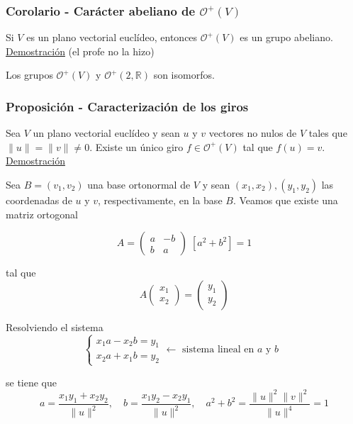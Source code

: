 \documentclass[12pt, a4paper, ones, notitlepage, openany,titlepage]{article}
\newcommand{\demostracion}{\noindent\underline{Demostración}}
\begin{document}
\subsubsection{Corolario - Carácter abeliano de $\mathcal{O}^{+}(V)$}
\noindent Si $V$ es un plano vectorial euclídeo, entonces $\mathcal{O}^{+}(V)$ es un grupo abeliano.\\

\demostracion \; (el profe no la hizo)

\noindent Los grupos $\mathcal{O}^{+}(V)$ y $\mathcal{O}^{+}(2, \mathbb{R})$ son isomorfos.

\subsubsection{Proposición - Caracterización de los giros}
Sea $V$ un plano vectorial euclídeo y sean $u$ y $v$ vectores no nulos de $V$ tales que $\|u\|=\|v\| \neq 0$. Existe un único giro $f \in \mathcal{O}^{+}(V)$ tal que $f(u)=v$.\\

\demostracion

Sea $B=\left(v_{1}, v_{2}\right)$ una base ortonormal de $V$ y sean $\left(x_{1}, x_{2}\right),\left(y_{1}, y_{2}\right)$ las coordenadas de $u$ y $v$, respectivamente, en la base $B$. Veamos que existe una matriz ortogonal

$$
A=\left(\begin{array}{rr}
	a & -b \\
	b & a
\end{array}\right)
\; [a^2 + b^2] = 1
$$

tal que
$$
A\left(\begin{array}{l}
	x_{1} \\
	x_{2}
\end{array}\right)=\left(\begin{array}{l}
	y_{1} \\
	y_{2}
\end{array}\right)
$$

Resolviendo el sistema
$$
\begin{cases}
	x_{1} a-x_{2} b=y_{1} \\ x_{2} a+x_{1} b=y_{2}
\end{cases}
\longleftarrow \text{ sistema lineal en $a$ y $b$ }
$$

se tiene que
$$
a=\frac{x_{1} y_{1}+x_{2} y_{2}}{\|u\|^{2}}, \quad b=\frac{x_{1} y_{2}-x_{2} y_{1}}{\|u\|^{2}}, \quad a^{2}+b^{2}=\frac{\|u\|^{2}\|v\|^{2}}{\|u\|^{4}}=1
$$
\end{document}
